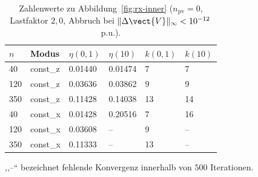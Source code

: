 \begin{table}[htbp]
\centering
\caption{Zahlenwerte zu Abbildung~\ref{fig:rx-inner} ($n_\mathrm{pv}=0$, Lastfaktor $2{,}0$, Abbruch bei $\lVert\Delta\vect{V}\rVert_\infty<10^{-12}\,$p.u.).}
\label{tab:rx-inner}
\begin{tabular}{llllll}
\toprule
$n$ & Modus & $\eta(0{,}1)$ & $\eta(10)$ & $k(0{,}1)$ & $k(10)$ \\
\midrule
40 & const\_z & 0.01440 & 0.01474 & 7 & 7 \\
120 & const\_z & 0.03636 & 0.03862 & 9 & 9 \\
350 & const\_z & 0.11428 & 0.14038 & 13 & 14 \\
40 & const\_x & 0.01428 & 0.20516 & 7 & 16 \\
120 & const\_x & 0.03608 & {--} & 9 & {--} \\
350 & const\_x & 0.11333 & {--} & 13 & {--} \\
\bottomrule
\end{tabular}

\smallskip
\footnotesize
\raggedright
,,--`` bezeichnet fehlende Konvergenz innerhalb von $500$ Iterationen.
\end{table}
